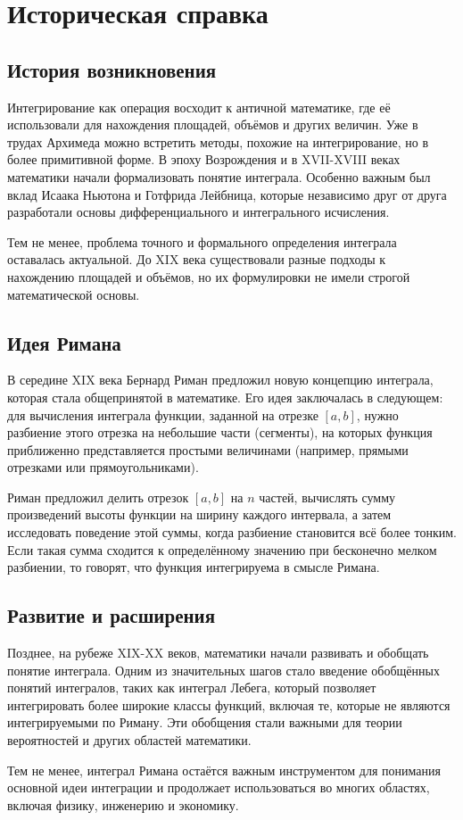 
\section{Историческая справка}

\subsection{История возникновения}

Интегрирование как операция восходит к античной математике, где её использовали
для нахождения площадей, объёмов и других величин. Уже в трудах Архимеда можно
встретить методы, похожие на интегрирование, но в более примитивной форме. В
эпоху Возрождения и в XVII-XVIII веках математики начали формализовать понятие
интеграла. Особенно важным был вклад Исаака Ньютона и Готфрида Лейбница,
которые независимо друг от друга разработали основы дифференциального и
интегрального исчисления.

Тем не менее, проблема точного и формального определения интеграла оставалась
актуальной. До XIX века существовали разные подходы к нахождению площадей и
объёмов, но их формулировки не имели строгой математической основы.

\subsection{Идея Римана}

В середине XIX века Бернард Риман предложил новую концепцию интеграла, которая
стала общепринятой в математике. Его идея заключалась в следующем: для
вычисления интеграла функции, заданной на отрезке
$[a, b]$, нужно разбиение этого отрезка на небольшие части (сегменты), на
которых функция приближенно представляется простыми величинами
(например, прямыми отрезками или прямоугольниками).

Риман предложил делить отрезок $[a, b]$ на $n$ частей, вычислять сумму
произведений высоты функции на ширину каждого интервала, а затем исследовать
поведение этой суммы, когда разбиение становится всё более тонким. Если такая
сумма сходится к определённому значению при бесконечно мелком разбиении, то
говорят, что функция интегрируема в смысле Римана.

\subsection{Развитие и расширения}

Позднее, на рубеже XIX-XX веков, математики начали развивать и обобщать понятие
интеграла. Одним из значительных шагов стало введение обобщённых понятий
интегралов, таких как интеграл Лебега, который позволяет интегрировать более
широкие классы функций, включая те, которые не являются интегрируемыми
по Риману. Эти обобщения стали важными для теории вероятностей и других
областей математики.

Тем не менее, интеграл Римана остаётся важным инструментом для понимания
основной идеи интеграции и продолжает использоваться во многих областях,
включая физику, инженерию и экономику.

